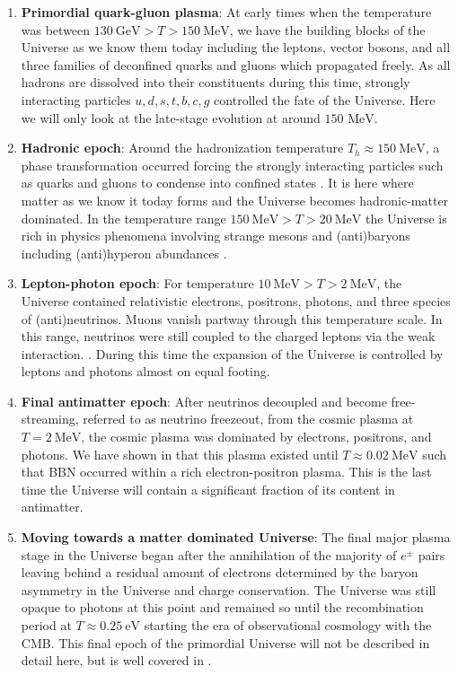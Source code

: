 \documentclass[universe,article,submit,moreauthors,pdftex,a4paper]{Definitions/mdpi}
\newcommand{\MeV}{\text{ MeV}}
\begin{document}
\begin{enumerate}
  \item \textbf{Primordial quark-gluon plasma}: At early times when the temperature was between $130\ \mathrm{GeV}>T>150\ \mathrm{MeV}$, we have the building blocks of the Universe as we know them today including the leptons, vector bosons, and all three families of deconfined quarks and gluons which propagated freely. As all hadrons are dissolved into their constituents during this time, strongly interacting particles $u,d,s,t,b,c,g$ controlled the fate of the Universe. Here we will only look at the late-stage evolution at around $150\MeV$.
  \item \textbf{Hadronic epoch}: Around the hadronization temperature $T_h\approx150\ \mathrm{MeV}$, a phase transformation occurred forcing the strongly interacting particles such as quarks and gluons to condense into confined states \cite{Letessier:2005qe,Bazavov:2011nk}. It is here where matter as we know it today forms and the Universe becomes hadronic-matter dominated. In the temperature range $ 150\ \mathrm{MeV}>T>20\ \mathrm{MeV}$ the Universe is rich in physics phenomena involving strange mesons and (anti)baryons including (anti)hyperon abundances \cite{Fromerth:2012fe,Yang:2021bko}.
  \item  \textbf{Lepton-photon epoch}: For temperature $10\ \mathrm{MeV}>T>2\ \mathrm{MeV}$, the Universe contained relativistic electrons, positrons, photons, and three species of (anti)neutrinos. Muons vanish partway through this temperature scale. In this range, neutrinos were still coupled to the charged leptons via the weak interaction. \cite{Birrell:2012gg,Birrell:2014ona}. During this time the expansion of the Universe is controlled by leptons and photons almost on equal footing.
  \item  \textbf{Final antimatter epoch}: After neutrinos decoupled and become free-streaming, referred to as neutrino freezeout, from the cosmic plasma at $T=2\ \mathrm{MeV}$, the cosmic plasma was dominated by electrons, positrons, and photons. We have shown in \cite{Chris:2023abc} that this plasma existed until $T\approx0.02\ \mathrm{MeV}$ such that BBN occurred within a rich electron-positron plasma. This is the last time the Universe will contain a significant fraction of its content in antimatter.
  \item \textbf{Moving towards a matter dominated Universe}: The final major plasma stage in the Universe began after the annihilation of the majority of $e^{\pm}$ pairs leaving behind a residual amount of electrons determined by the baryon asymmetry in the Universe and charge conservation. The Universe was still opaque to photons at this point and remained so until the recombination period at $T\approx0.25\ \mathrm{eV}$ starting the era of observational cosmology with the CMB. This final epoch of the primordial Universe will not be described in detail here, but is well covered in \cite{Planck:2018vyg}.
\end{enumerate}
\end{document}
